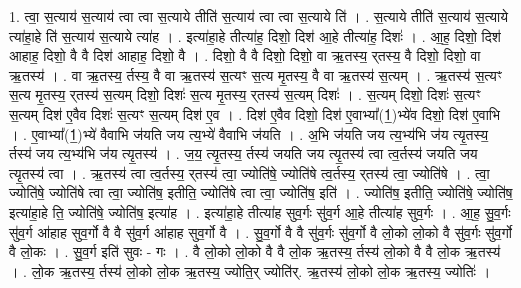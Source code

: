 \documentclass[17pt]{extarticle}
\begin{document}
1. त्वा॒ स॒त्याय॑ स॒त्याय॑ त्वा त्वा स॒त्याये तीति॑ स॒त्याय॑ त्वा त्वा स॒त्याये ति॑ । . स॒त्याये तीति॑ स॒त्याय॑ स॒त्याये त्या॑हा॒हे ति॑ स॒त्याय॑ स॒त्याये त्या॑ह । . इत्या॑हा॒हे तीत्या॑ह॒ दिशो॒ दिश॑ आ॒हे तीत्या॑ह॒ दिशः॑ । . आ॒ह॒ दिशो॒ दिश॑ आहाह॒ दिशो॒ वै वै दिश॑ आहाह॒ दिशो॒ वै । . दिशो॒ वै वै दिशो॒ दिशो॒ वा ऋ॒तस्य॒ र्‌तस्य॒ वै दिशो॒ दिशो॒ वा ऋ॒तस्य॑ । . वा ऋ॒तस्य॒ र्तस्य॒ वै वा ऋ॒तस्य॑ स॒त्यꣳ स॒त्य मृ॒तस्य॒ वै वा ऋ॒तस्य॑ स॒त्यम् । . ऋ॒तस्य॑ स॒त्यꣳ स॒त्य मृ॒तस्य॒ र्‌तस्य॑ स॒त्यम् दिशो॒ दिशः॑ स॒त्य मृ॒तस्य॒ र्‌तस्य॑ स॒त्यम् दिशः॑ । . स॒त्यम् दिशो॒ दिशः॑ स॒त्यꣳ स॒त्यम् दिश॑ ए॒वैव दिशः॑ स॒त्यꣳ स॒त्यम् दिश॑ ए॒व । . दिश॑ ए॒वैव दिशो॒ दिश॑ ए॒वाभ्या᳚(1॒)भ्ये॑व दिशो॒ दिश॑ ए॒वाभि । . ए॒वाभ्या᳚(1॒)भ्ये॑ वैवाभि ज॑यति जय त्य॒भ्ये॑ वैवाभि ज॑यति । . अ॒भि ज॑यति जय त्य॒भ्य॑भि ज॑य त्यृ॒तस्य॒ र्तस्य॑ जय त्य॒भ्य॑भि ज॑य त्यृ॒तस्य॑ । . ज॒य॒ त्यृ॒तस्य॒ र्तस्य॑ जयति जय त्यृ॒तस्य॑ त्वा त्व॒र्तस्य॑ जयति जय त्यृ॒तस्य॑ त्वा । . ऋ॒तस्य॑ त्वा त्व॒र्तस्य॒ र्‌तस्य॑ त्वा॒ ज्योति॑षे॒ ज्योति॑षे त्व॒र्तस्य॒ र्‌तस्य॑ त्वा॒ ज्योति॑षे । . त्वा॒ ज्योति॑षे॒ ज्योति॑षे त्वा त्वा॒ ज्योति॑ष॒ इतीति॒ ज्योति॑षे त्वा त्वा॒ ज्योति॑ष॒ इति॑ । . ज्योति॑ष॒ इतीति॒ ज्योति॑षे॒ ज्योति॑ष॒ इत्या॑हा॒हे ति॒ ज्योति॑षे॒ ज्योति॑ष॒ इत्या॑ह । . इत्या॑हा॒हे तीत्या॑ह सुव॒र्गः सु॑व॒र्ग आ॒हे तीत्या॑ह सुव॒र्गः । . आ॒ह॒ सु॒व॒र्गः सु॑व॒र्ग आ॑हाह सुव॒र्गो वै वै सु॑व॒र्ग आ॑हाह सुव॒र्गो वै । . सु॒व॒र्गो वै वै सु॑व॒र्गः सु॑व॒र्गो वै लो॒को लो॒को वै सु॑व॒र्गः सु॑व॒र्गो वै लो॒कः । . सु॒व॒र्ग इति॑ सुवः - गः । . वै लो॒को लो॒को वै वै लो॒क ऋ॒तस्य॒ र्तस्य॑ लो॒को वै वै लो॒क ऋ॒तस्य॑ । . लो॒क ऋ॒तस्य॒ र्तस्य॑ लो॒को लो॒क ऋ॒तस्य॒ ज्योति॒र् ज्योति॑र्. ऋ॒तस्य॑ लो॒को लो॒क ऋ॒तस्य॒ ज्योतिः॑ । \newline
\end{document}
